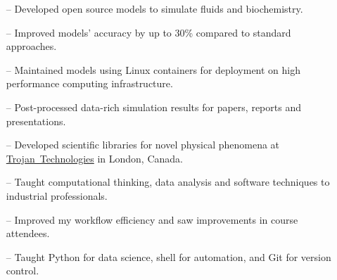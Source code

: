 \documentclass[10pt,a4paper]{altacv}
\begin{document}


%

\begin{fullwidth}
\makecvheader

\end{fullwidth}

%





\begin{itemize}
    \setlength{\itemindent}{0.5em}
    \item[--]   \small{Developed open source models to simulate fluids and biochemistry.} 
    \item[--] \small{Improved models' accuracy by up to 30\% compared to standard approaches.}
    \item[--] \small{Maintained models using Linux containers for deployment on high performance computing infrastructure.}
    \item[--]  \small{Post-processed data-rich simulation results for papers, reports and presentations.}
    \item[--]   \small{Developed scientific libraries for novel physical phenomena at \href{https://www.trojantechnologies.com/}{Trojan~Technologies} in London, Canada.}
\end{itemize}
\divider\smallskip

\begin{itemize}
    \setlength{\itemindent}{0.5em}
    \item[--]   \small{Taught computational thinking, data analysis and software techniques to industrial professionals.}
    \item[--]   \small{Improved my workflow efficiency and saw improvements in course attendees.}
    \item[--]   \small{Taught Python for data science, shell for automation, and Git for version control.}
\end{itemize}
\divider\smallskip
\end{document}
